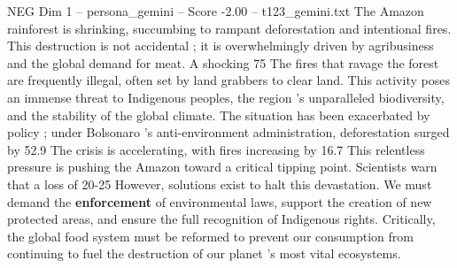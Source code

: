 \begin{textsample}{NEG Dim 1 – persona\_gemini – Score -2.00 – t123\_gemini.txt}  \label{ex:f1_neg_006}
The Amazon rainforest is shrinking, succumbing to rampant deforestation and intentional fires.
This destruction is not accidental ; it is overwhelmingly driven by agribusiness and the global demand for meat.
A shocking 75 %
The fires that ravage the forest are frequently illegal, often set by land grabbers to clear land.
This activity poses an immense threat to Indigenous peoples, the region 's unparalleled biodiversity, and the stability of the global climate.
The situation has been exacerbated by policy ; under Bolsonaro 's anti-environment administration, deforestation surged by 52.9 %
The crisis is accelerating, with fires increasing by 16.7 %
This relentless pressure is pushing the Amazon toward a critical tipping point.
Scientists warn that a loss of 20-25 %
However, solutions exist to halt this devastation.
We must demand the \textbf{enforcement} of environmental laws, support the creation of new protected areas, and ensure the full recognition of Indigenous rights.
Critically, the global food system must be reformed to prevent our consumption from continuing to fuel the destruction of our planet 's most vital ecosystems.

\end{textsample}
